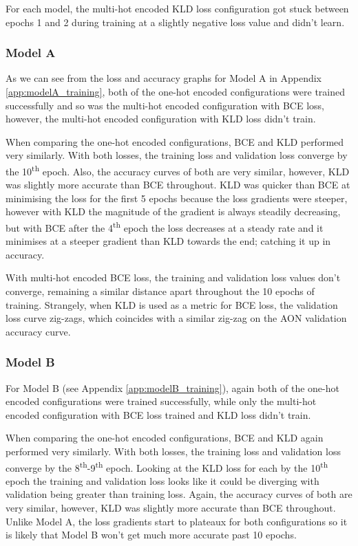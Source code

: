 \documentclass[12pt]{article}
\begin{document}
    For each model, the multi-hot encoded KLD loss configuration got stuck between epochs 1 and 2 during training at a slightly negative loss value and didn't learn.\medskip 
	
	\subsubsection{Model A}
	\label{sec:training_analysis_modelA}
	
	As we can see from the loss and accuracy graphs for Model A in Appendix \ref{app:modelA_training}, both of the one-hot encoded configurations were trained successfully and so was the multi-hot encoded configuration with BCE loss, however, the multi-hot encoded configuration with KLD loss didn't train.\medskip
	
	When comparing the one-hot encoded configurations, BCE and KLD performed very similarly. With both losses, the training loss and validation loss converge by the 10\textsuperscript{th} epoch. Also, the accuracy curves of both are very similar, however, KLD was slightly more accurate than BCE throughout. KLD was quicker than BCE at minimising the loss for the first 5 epochs because the loss gradients were steeper, however with KLD the magnitude of the gradient is always steadily decreasing, but with BCE after the 4\textsuperscript{th} epoch the loss decreases at a steady rate and it minimises at a steeper gradient than KLD towards the end; catching it up in accuracy.\medskip
	
	With multi-hot encoded BCE loss, the training and validation loss values don't converge, remaining a similar distance apart throughout the 10 epochs of training. Strangely, when KLD is used as a metric for BCE loss, the validation loss curve zig-zags, which coincides with a similar zig-zag on the AON validation accuracy curve.\medskip
	
	\subsubsection{Model B}
	\label{sec:training_analysis_modelB}
	
	For Model B (see Appendix \ref{app:modelB_training}), again both of the one-hot encoded configurations were trained successfully, while only the multi-hot encoded configuration with BCE loss trained and KLD loss didn't train.\medskip
	
	When comparing the one-hot encoded configurations, BCE and KLD again performed very similarly. With both losses, the training loss and validation loss converge by the 8\textsuperscript{th}-9\textsuperscript{th} epoch. Looking at the KLD loss for each by the 10\textsuperscript{th} epoch the training and validation loss looks like it could be diverging with validation being greater than training loss. Again, the accuracy curves of both are very similar, however, KLD was slightly more accurate than BCE throughout. Unlike Model A, the loss gradients start to plateaux for both configurations so it is likely that Model B won't get much more accurate past 10 epochs.\medskip
	
\end{document}
